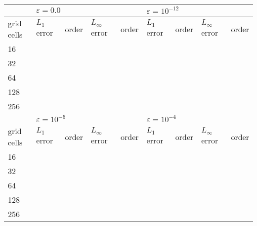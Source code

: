 \documentclass[12pt,letterpaper]{article}
\begin{document}
        \begin{center}\vspace{1cm}
        \begin{tabular}{|l|l|l|l|l|l|l|l|l|}
        \hline
                   & \multicolumn{4}{l|}{$\varepsilon = 0.0$}              & \multicolumn{4}{l|}{$\varepsilon = 10^{-12}$}         \\ \hline
        grid cells & $L_{1}$ error & order & $L_{\infty}$ error & order & $L_{1}$ error & order & $L_{\infty}$ error & order \\ \hline
        16         &               &       &                    &       &               &       &                    &       \\ \hline
        32         &               &       &                    &       &               &       &                    &       \\ \hline
        64         &               &       &                    &       &               &       &                    &       \\ \hline
        128        &               &       &                    &       &               &       &                    &       \\ \hline
        256        &               &       &                    &       &               &       &                    &       \\ \hline
                   & \multicolumn{4}{l|}{$\varepsilon = 10^{-6}$}          & \multicolumn{4}{l|}{$\varepsilon = 10^{-4}$}          \\ \hline
        grid cells & $L_{1}$ error & order & $L_{\infty}$ error & order & $L_{1}$ error & order & $L_{\infty}$ error & order \\ \hline
        16         &               &       &                    &       &               &       &                    &       \\ \hline
        32         &               &       &                    &       &               &       &                    &       \\ \hline
        64         &               &       &                    &       &               &       &                    &       \\ \hline
        128        &               &       &                    &       &               &       &                    &       \\ \hline
        256        &               &       &                    &       &               &       &                    &       \\ \hline
        \end{tabular}
        \end{center}\vspace{1cm}
\end{document}
